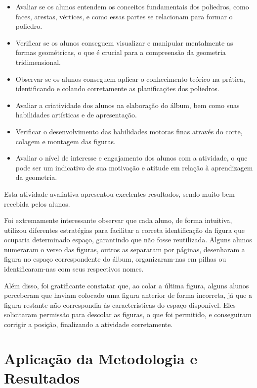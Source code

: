 \begin{itemize}
    \item Avaliar se os alunos entendem os conceitos fundamentais dos poliedros, como faces, arestas, vértices, e como essas partes se relacionam para formar o poliedro.
    \item Verificar se os alunos conseguem visualizar e manipular mentalmente as formas geométricas, o que é crucial para a compreensão da geometria tridimensional.
    \item Observar se os alunos conseguem aplicar o conhecimento teórico na prática, identificando e colando corretamente as planificações dos poliedros.
    \item Avaliar a criatividade dos alunos na elaboração do álbum, bem como suas habilidades artísticas e de apresentação.
    \item Verificar o desenvolvimento das habilidades motoras finas através do corte, colagem e montagem das figuras.
    \item Avaliar o nível de interesse e engajamento dos alunos com a atividade, o que pode ser um indicativo de sua motivação e atitude em relação à aprendizagem da geometria.
\end{itemize}

Esta atividade avaliativa apresentou excelentes resultados, sendo muito bem recebida pelos alunos.

Foi extremamente interessante observar que cada aluno, de forma intuitiva, utilizou diferentes estratégias para facilitar a correta identificação da figura que ocuparia determinado espaço, garantindo que não fosse reutilizada. Alguns alunos numeraram o verso das figuras, outros as separaram por páginas, desenharam a figura no espaço correspondente do álbum, organizaram-nas em pilhas ou identificaram-nas com seus respectivos nomes.

Além disso, foi gratificante constatar que, ao colar a última figura, alguns alunos perceberam que haviam colocado uma figura anterior de forma incorreta, já que a figura restante não correspondia às características do espaço disponível. Eles solicitaram permissão para descolar as figuras, o que foi permitido, e conseguiram corrigir a posição, finalizando a atividade corretamente.

\chapter{Aplicação da Metodologia e Resultados} \label{cap:4_aplicacao}

